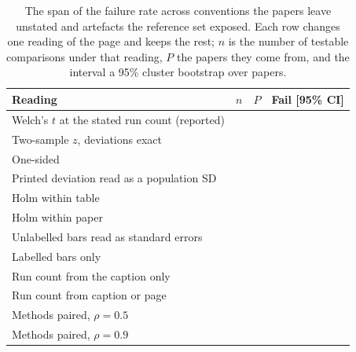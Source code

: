 \documentclass[sigconf,anonymous]{aamas}
\begin{document}
\begin{table}[t]
\caption{The span of the failure rate across conventions the papers leave
unstated and artefacts the reference set exposed. Each row changes one
reading of the page and keeps the rest; $n$ is the number of testable
comparisons under that reading, $P$ the papers they come from, and the
interval a 95\% cluster bootstrap over papers.}
\label{tab:span}
\footnotesize
\setlength{\tabcolsep}{3pt}
\begin{tabular}{@{}lrrl@{}}
\toprule
Reading & $n$ & $P$ & Fail [95\% CI] \\
\midrule
Welch's $t$ at the stated run count (reported) & \nSpanAsReportedN{} & \nSpanAsReportedPapers{} & \nSpanAsReportedFail{} \nSpanAsReportedFailCi{} \\
Two-sample $z$, deviations exact & \nSpanZTwoSidedN{} & \nSpanZTwoSidedPapers{} & \nSpanZTwoSidedFail{} \nSpanZTwoSidedFailCi{} \\
One-sided & \nSpanOneSidedN{} & \nSpanOneSidedPapers{} & \nSpanOneSidedFail{} \nSpanOneSidedFailCi{} \\
Printed deviation read as a population SD & \nDdofN{} & \nSpanAsReportedPapers{} & \nDdofFail{} \\
Holm within table & \nSpanAsReportedN{} & \nSpanAsReportedPapers{} & \nSpanAsReportedFailHolm{} \\
Holm within paper & \nSpanHolmFamilyPaperN{} & \nSpanHolmFamilyPaperPapers{} & \nSpanHolmFamilyPaperFailHolm{} \\
Unlabelled bars read as standard errors & \nSpanUnlabelledAsSemN{} & \nSpanUnlabelledAsSemPapers{} & \nSpanUnlabelledAsSemFail{} \nSpanUnlabelledAsSemFailCi{} \\
Labelled bars only & \nSpanLabelledOnlyN{} & \nSpanLabelledOnlyPapers{} & \nSpanLabelledOnlyFail{} \nSpanLabelledOnlyFailCi{} \\
Run count from the caption only & \nSpanCaptionOnlyN{} & \nSpanCaptionOnlyPapers{} & \nSpanCaptionOnlyFail{} \nSpanCaptionOnlyFailCi{} \\
Run count from caption or page & \nSpanCaptionOrPageN{} & \nSpanCaptionOrPagePapers{} & \nSpanCaptionOrPageFail{} \nSpanCaptionOrPageFailCi{} \\
Methods paired, $\rho = 0.5$ & \nSpanRhoHalfN{} & \nSpanRhoHalfPapers{} & \nSpanRhoHalfFail{} \nSpanRhoHalfFailCi{} \\
Methods paired, $\rho = 0.9$ & \nSpanRhoNineTenthsN{} & \nSpanRhoNineTenthsPapers{} & \nSpanRhoNineTenthsFail{} \nSpanRhoNineTenthsFailCi{} \\

\end{tabular}
\end{table}
\end{document}
